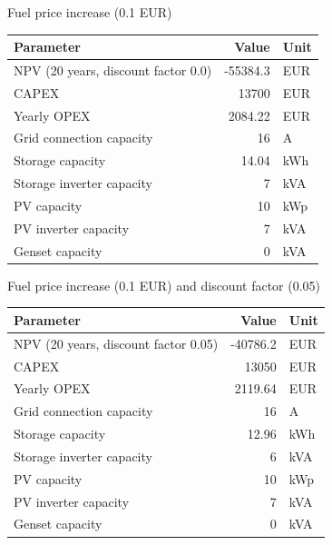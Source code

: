 \begin{frame}{Fuel price increase (0.1 EUR)}
    \begin{tabular}{lrl}
\hline
 Parameter                           &    Value & Unit   \\
\hline
 NPV (20 years, discount factor 0.0) & -55384.3 & EUR    \\
 CAPEX                               &    13700 & EUR    \\
 Yearly OPEX                         &  2084.22 & EUR    \\
 Grid connection capacity            &       16 & A      \\
 Storage capacity                    &    14.04 & kWh    \\
 Storage inverter capacity           &        7 & kVA    \\
 PV capacity                         &       10 & kWp    \\
 PV inverter capacity                &        7 & kVA    \\
 Genset capacity                     &        0 & kVA    \\
\hline
\end{tabular}
\end{frame}


\begin{frame}{Fuel price increase (0.1 EUR) and discount factor (0.05)}
\begin{tabular}{lrl}
\hline
 Parameter                            &    Value & Unit   \\
\hline
 NPV (20 years, discount factor 0.05) & -40786.2 & EUR    \\
 CAPEX                                &    13050 & EUR    \\
 Yearly OPEX                          &  2119.64 & EUR    \\
 Grid connection capacity             &       16 & A      \\
 Storage capacity                     &    12.96 & kWh    \\
 Storage inverter capacity            &        6 & kVA    \\
 PV capacity                          &       10 & kWp    \\
 PV inverter capacity                 &        7 & kVA    \\
 Genset capacity                      &        0 & kVA    \\
\hline
\end{tabular}
\end{frame}

